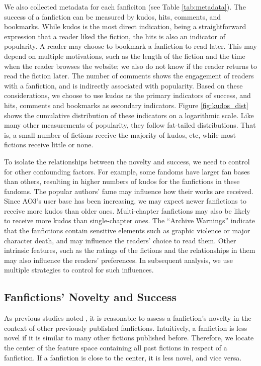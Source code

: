 \documentclass[letterpaper]{article} %
\begin{document}
We also collected metadata for each fanficiton (see Table \ref{tab:metadata}). The success of a fanfiction can be measured by kudos, hits, comments, and bookmarks. While kudos is the most direct indication, being a straightforward expression that a reader liked the fiction, the hits is also an indicator of popularity. A reader may choose to bookmark a fanfiction to read later. This may depend on multiple motivations, such as the length of the fiction and the time when the reader browses the website; we also do not know if the reader returns to read the fiction later. The number of comments shows the engagement of readers with a fanfiction, and is indirectly associated with popularity. Based on these considerations, we choose to use kudos as the primary indicators of success, and hits, comments and bookmarks as secondary indicators. Figure \ref{fig:kudos_dist} shows the cumulative distribution of these indicators on a logarithmic scale. Like many other measurements of popularity, they follow fat-tailed distributions. That is, a small number of fictions receive the majority of kudos, etc, while most fictions receive little or none. 

To isolate the relationships between the novelty and success, we need to control for other confounding factors. For example, some fandoms have larger fan bases than others, resulting in higher numbers of kudos for the fanfictions in these fandoms. The popular authors' fame may influence how their works are received. Since AO3's user base has been increasing, we may expect newer fanfictions to receive more kudos than older ones. Multi-chapter fanfictions may also be likely to receive more kudos than single-chapter ones. The ``Archive Warnings'' indicate that the fanfictions contain sensitive elements such as graphic violence or major character death, and may influence the readers' choice to read them. Other intrinsic features, such as the ratings of the fictions and the relationships in them may also influence the readers' preferences. In subsequent analysis, we use multiple strategies to control for such influences.


\subsection*{Fanfictions' Novelty and Success}
As previous studies noted \cite{askin2017makes} \cite{de2015game}, it is reasonable to assess a fanfiction's novelty in the context of other previously published fanfictions. Intuitively, a fanfiction is less novel if it is similar to many other fictions published before. Therefore, we locate the center of the feature space containing all past fictions in respect of a fanfiction. If a fanfiction is close to the center, it is less novel, and vice versa.
\end{document}
